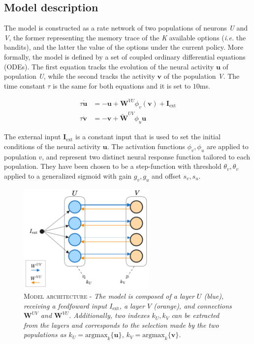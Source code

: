 
\subsection{Model description}
The model is constructed as a rate network of two populations of neurons \textit{U} and \textit{V}, the former representing the memory trace of the \textit{K} available options (\textit{i.e.} the bandits), and the latter the value of the options under the current policy.
More formally, the model is defined by a set of coupled ordinary differential equations (ODEs).
The first equation tracks the evolution of the neural activity $\textbf{u}$ of population \textit{U}, while the second tracks the activity $\textbf{v}$ of the population \textit{V}. The time constant $\tau$ is the same for both equations and it is set to $10$ms.

\begin{equation}
\begin{aligned}
    \tau \dot{\textbf{u}}&= -\textbf{u} + \textbf{W}^{VU}\phi_{v}(\textbf{v}) + \textbf{I}_{\text{ext}} \\
    \tau \dot{\textbf{v}}&= -\textbf{v} + \tilde{\textbf{W}}^{UV}\phi_{u}\textbf{u}
\end{aligned}
\end{equation}\label{eq:main}

\noindent The external input $\textbf{I}_{\text{ext}}$ is a constant input that is used to set the initial conditions of the neural activity $\textbf{u}$.
The activation functions $\phi_{v},\phi_{u}$ are applied to population $v$, and represent two distinct neural response function tailored to each population. They have been chosen to be a step-function with threshold $\theta_{v},\theta_{v}$ applied to a generalized sigmoid with gain $g_{v},g_{u}$ and offset $s_{v},s_{u}$.

\begin{figure}[ht]
    \centering
    \includegraphics[width=0.6\textwidth]{figures/minb_architecture.png}
    \caption{\textsc{Model architecture} - \textit{The model is composed of a layer $U$ (blue), receiving a feedfoward input $I_{\text{ext}}$, a layer $V$ (orange), and connections $\textbf{W}^{UV}$ and $\textbf{W}^{VU}$. Additionally, two indexes $k_{U}, k_{V}$  can be extracted from the layers and
    corresponds to the selection made by the two populations as $k_{U}=\text{argmax}_{k} \{\textbf{u}\}$, $k_{V}=\text{argmax}_{k} \{\textbf{v}\}$.}}
    \label{fig:main_architecture}
\end{figure}

